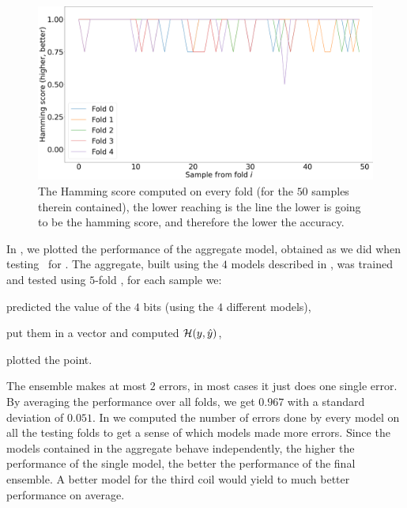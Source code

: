 \begin{figure}[!ht]
	\centering
	\includegraphics[width=0.7\linewidth]{img/best_dts_hs.png}
	\caption{The Hamming score computed on every fold (for the $50$ samples therein contained),
	the lower reaching is the line the lower is going to be the hamming score, and therefore the
	lower the accuracy.} \label{fig:dt-qlp-hs}
\end{figure}
In , we plotted the performance of the aggregate model, obtained as we
did when testing \tas\ for \qrp. The aggregate, built using the $4$ models described in
, was trained and tested using $5$-fold \cv, for each sample we:
\begin{inparaenum}[(i)]
\item predicted the value of the $4$ bits (using the $4$ different models),
\item put them in a vector and computed $\mathcal{H}(y, \hat{y})$,
\item plotted the point.
\end{inparaenum}
The ensemble makes at most $2$ errors, in most cases it just does one single error. By averaging the
performance over all folds, we get $0.967$ with a standard deviation of $0.051$. In
 we computed the number of errors done by every model on all the testing folds
to get a sense of which models made more errors. Since the models contained in the aggregate behave
independently, the higher the performance of the single model, the better the performance of the
final ensemble. A better model for the third coil would yield to much better performance on average.
